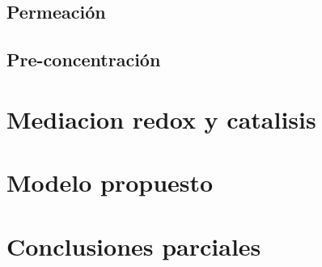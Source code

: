 	\subsection{Permeación}

	\subsection{Pre-concentración}

\section{Mediacion redox y catalisis}

\section{Modelo propuesto}

\section{Conclusiones parciales}





	


